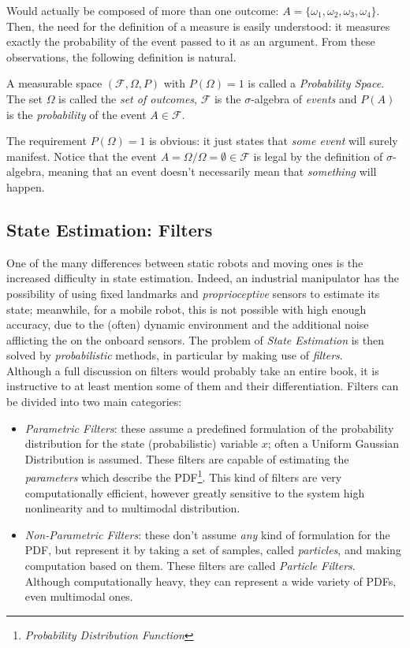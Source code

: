                             Would actually be composed of more than one outcome: $A=\{\omega_1,\omega_2,\omega_3,\omega_4\}$. Then, the need for the definition of a measure is easily understood: it measures exactly the probability of the event passed to it as an argument. From these observations, the following definition is natural.
                            \begin{definition}
                                A measurable space $(\mathcal{F},\Omega,P)$ with $P(\Omega)=1$ is called a \textit{Probability Space}. The set $\Omega$ is called the \textit{set of outcomes}, $\mathcal{F}$ is the $\sigma$-algebra of \textit{events} and $P(A)$ is the \textit{probability} of the event $A\in\mathcal{F}$.   
                            \end{definition}
                            The requirement $P(\Omega)=1$ is obvious: it just states that \textit{some event} will surely manifest. Notice that the event $A=\Omega/\Omega=\emptyset\in\mathcal{F}$ is legal by the definition of $\sigma$-algebra, meaning that an event doesn't necessarily mean that \textit{something} will happen. 
                    \subsection{State Estimation: Filters}
                        One of the many differences between static robots and moving ones is the increased difficulty in state estimation. Indeed, an industrial manipulator has the possibility of using fixed landmarks and \textit{proprioceptive} sensors to estimate its state; meanwhile, for a mobile robot, this is not possible with high enough accuracy, due to the (often) dynamic environment and the additional noise afflicting the on the onboard sensors. The problem of \textit{State Estimation} is then solved by \textit{probabilistic} methods, in particular by making use of \textit{filters}.\\
                        Although a full discussion on filters would probably take an entire book, it is instructive to at least mention some of them and their differentiation. Filters can be divided into two main categories:
                        \begin{itemize}
                            \item \textit{Parametric Filters}: these assume a predefined formulation of the probability distribution for the state (probabilistic) variable $x$; often a Uniform Gaussian Distribution is assumed. These filters are capable of estimating the \textit{parameters} which describe the PDF\footnote{\textit{Probability Distribution Function}}. This kind of filters are very computationally efficient, however greatly sensitive to the system high nonlinearity and to multimodal distribution.
                            \item \textit{Non-Parametric Filters}: these don't assume \textit{any} kind of formulation for the PDF, but represent it by taking a set of samples, called \textit{particles}, and making computation based on them. These filters are called \textit{Particle Filters}. Although computationally heavy, they can represent a wide variety of PDFs, even multimodal ones.
                        \end{itemize}
